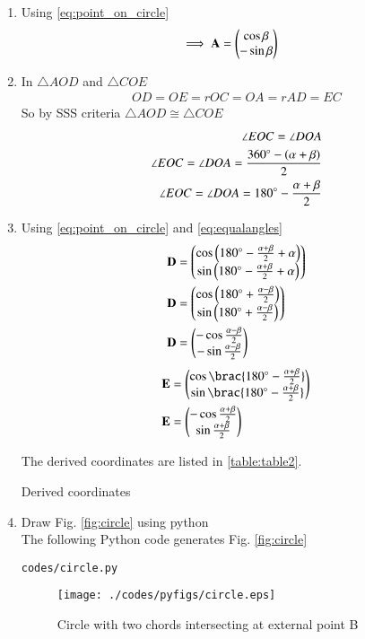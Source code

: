 \begin{enumerate}[label=\thesection.\arabic*.,ref=\thesection.\theenumi]
\item Using \ref{eq:point_on_circle}
\begin{align}
\implies \mathbf{A} &= \begin{pmatrix}\cos \beta \\ -\sin \beta\end{pmatrix}
\label{eq:constr_a}
\end{align}
%

\item In $\triangle AOD$ and $\triangle COE$
\begin{align}
OD = OE = r
OC = OA = r
AD = EC 
\end{align}
So by SSS criteria $\triangle AOD \cong \triangle COE$
\begin{align}
\angle EOC = \angle DOA
\\
\angle EOC = \angle DOA = \frac{360^{\circ}-\left(\alpha+\beta\right)}{2}
\\
\angle EOC = \angle DOA = 180^{\circ}-\frac{\alpha+\beta}{2}
\label{eq:equalangles}
\end{align}

\item Using \ref{eq:point_on_circle} and \ref{eq:equalangles}
\begin{align}
\mathbf{D} &= \begin{pmatrix}\cos \left(180^{\circ}-\frac{\alpha+\beta}{2}+\alpha\right) \\ \sin \left(180^{\circ}-\frac{\alpha+\beta}{2}+\alpha\right)\end{pmatrix} 
\\
\mathbf{D} &= \begin{pmatrix}\cos \left(180^{\circ}+\frac{\alpha-\beta}{2}\right) \\ \sin \left(180^{\circ}+\frac{\alpha-\beta}{2}\right)\end{pmatrix}
\\
\mathbf{D} &= \begin{pmatrix}-\cos \frac{\alpha-\beta}{2} \\ -\sin \frac{\alpha-\beta}{2}\end{pmatrix}
\label{eq:constr_d}
\end{align}
\begin{align}
\vec{E} &= \myvec{\cos \brac{180^{\circ}-\frac{\alpha+\beta}{2}} \\ \sin \brac{180^{\circ}-\frac{\alpha+\beta}{2}}}
\\
\vec{E} &= \myvec{-\cos \frac{\alpha+\beta}{2} \\ \sin \frac{\alpha+\beta}{2}}

\end{align}


The derived coordinates are listed in \ref{table:table2}. 
%
\begin{table}[ht!]
\centering

\caption{Derived coordinates}
\label{table:table2}	
\end{table}
\item Draw Fig. \ref{fig:circle} using python	
\\
\solution The  following Python code generates Fig. \ref{fig:circle}
%
\begin{lstlisting}
codes/circle.py
\end{lstlisting}
\begin{figure}[!ht]
\centering
\texttt{[image: ./codes/pyfigs/circle.eps]}
\caption{Circle with two chords intersecting at external point B}
\label{fig:circle_py}
\end{figure}


\end{enumerate}
